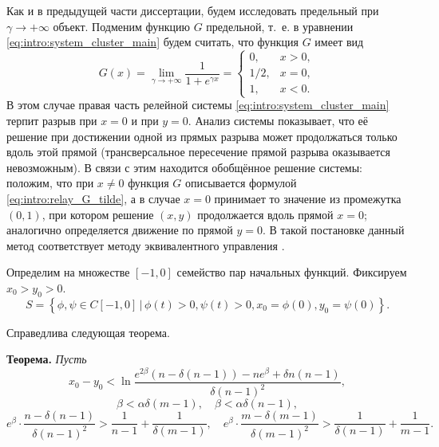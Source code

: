Как и в предыдущей части диссертации, будем исследовать предельный при $\gamma \to +\infty$ объект. Подменим функцию $G$ предельной, т.~е. в уравнении \eqref{eq:intro:system_cluster_main} будем считать, что функция $G$ имеет вид 
\begin{equation}
	\label{eq:intro:relay_G_tilde}
	G(x) = \lim\limits_{\gamma \to +\infty} \dfrac{1}{1 + e^{\gamma x}} = 
	\begin{cases}
		0, & x > 0,\\
		1/2, & x = 0,\\
		1, & x < 0.
	\end{cases}
\end{equation}
%
В этом случае правая часть релейной системы \eqref{eq:intro:system_cluster_main} терпит разрыв при $x = 0$ и при $y = 0$. Анализ системы показывает, что её решение при достижении одной из прямых разрыва может продолжаться только вдоль этой прямой (трансверсальное пересечение прямой разрыва оказывается невозможным). В связи с этим находится обобщённое решение системы: положим, что при $x \neq 0$ функция $G$ описывается формулой \eqref{eq:intro:relay_G_tilde}, а в случае $x = 0$ принимает то значение из промежутка $(0, 1)$, при котором решение $(x, y)$ продолжается вдоль прямой $x = 0$; аналогично определяется движение по прямой $y = 0$. В такой постановке данный метод соответствует методу эквивалентного управления \cite{Utkin1981}. %


Определим на множестве $[-1, 0]$ семейство пар начальных функций. Фиксируем $x_0 > y_0 > 0$.
\begin{equation}
	\label{eq:intro:initial_set}
	S = \left\{\phi, \psi \in C[-1, 0] \,|\, \phi(t) > 0, \psi(t) > 0, x_0 = \phi(0), y_0 = \psi(0)\right\}.
\end{equation}

Справедлива следующая теорема.

\bigskip

\textbf{Теорема.}
	\textit{Пусть}
	\begin{equation}
		\label{eq:intro:constraint_1}
		x_0 - y_0 < \ln \dfrac{e^{2\beta}(n - \delta(n - 1)) - ne^{\beta} + \delta n(n - 1)}{\delta (n - 1)^2},
	\end{equation}
	\begin{equation}
		\label{eq:intro:constraint_2}
		\beta < \alpha \delta (m - 1), \quad \beta < \alpha \delta (n - 1),
	\end{equation}
	\small
	\begin{equation}
		\label{eq:intro:constraint_3}
		e^{\beta} \cdot \dfrac{n - \delta(n - 1)}{\delta (n - 1)^2} > \dfrac{1}{n - 1} + \dfrac{1}{\delta(m - 1)}, \quad
		e^{\beta} \cdot \dfrac{m - \delta(m - 1)}{\delta (m - 1)^2} > \dfrac{1}{\delta(n - 1)} + \dfrac{1}{m - 1}.
	\end{equation}
	\normalsize
	
